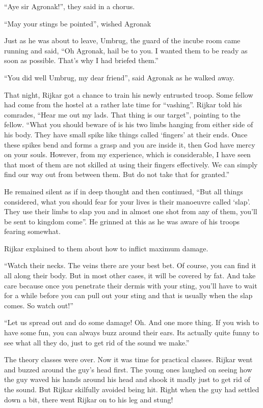 \documentclass[twoside,11pt,titlepage]{article}
\begin{document}
``Aye sir Agronak!'', they said in a chorus.

``May your stings be pointed'', wished Agronak

Just as he was about to leave, Umbrug, the guard of the incube room came running and said, ``Oh Agronak, hail be to you. I wanted them to be ready as soon as possible. That's why I had briefed them.''

``You did well Umbrug, my dear friend'', said Agronak as he walked away.

That night, Rijkar got a chance to train his newly entrusted troop. Some fellow had come from the hostel at a rather late time for ``vashing''. Rijkar told his comrades, ``Hear me out my lads. That thing is our target'', pointing to the fellow. ``What you should beware of is his two limbs hanging from either side of his body. They have small spike like things called `fingers' at their ends. Once these spikes bend and forms a grasp and you are inside it, then God have mercy on your souls. However, from my experience, which is considerable, I have seen that most of them are not skilled at using their fingers effectively. We can simply find our way out from between them. But do not take that for granted.''

He remained silent as if in deep thought and then continued, ``But all things considered, what you should fear for your lives is their manoeuvre called `slap'. They use their limbs to slap you and in almost one shot from any of them, you'll be sent to kingdom come''. He grinned at this as he was aware of his troops fearing somewhat.

Rijkar explained to them about how to inflict maximum damage.

``Watch their necks. The veins there are your best bet. Of course, you can find it all along their body. But in most other cases, it will be covered by fat. And take care because once you penetrate their dermis with your sting, you'll have to wait for a while before you can pull out your sting and that is usually when the slap comes. So watch out!''

``Let us spread out and do some damage! Oh. And one more thing. If you wish to have some fun, you can always buzz around their ears. Its actually quite funny to see what all they do, just to get rid of the sound we make.''

The theory classes were over. Now it was time for practical classes. Rijkar went and buzzed around the guy's head first. The young ones laughed on seeing how the guy waved his hands around his head and shook it madly just to get rid of the sound. But Rijkar skilfully avoided being hit. Right when the guy had settled down a bit, there went Rijkar on to his leg and stung!
\end{document}

